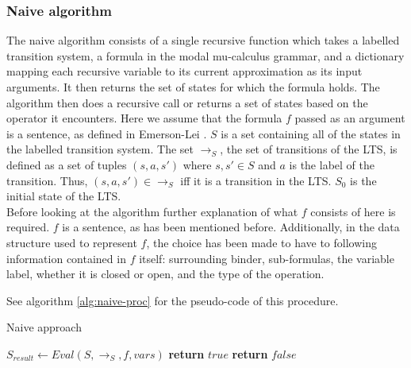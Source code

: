 \documentclass[10pt,a4paper]{article}
\begin{document}
\subsubsection{Naive algorithm}
The naive algorithm consists of a single recursive function which takes a labelled transition system, a formula in the modal mu-calculus grammar, and a dictionary mapping each recursive variable to its current approximation as its input arguments. It then returns the set of states for which the formula holds. The algorithm then does a recursive call or returns a set of states based on the operator it encounters. Here we assume that the formula $f$ passed as an argument is a sentence, as defined in Emerson-Lei \cite{elpaper}. $S$ is a set containing all of the states in the labelled transition system. The set $\to_S$, the set of transitions of the LTS, is defined as a set of tuples $(s,a,s\prime)$ where $s,s\prime \in S$ and $a$ is the label of the transition. Thus, $(s,a,s\prime) \in \to_S$ iff it is a transition in the LTS. $S_0$ is the initial state of the LTS.\\

Before looking at the algorithm further explanation of what $f$ consists of here is required. $f$ is a sentence, as has been mentioned before. Additionally, in the data structure used to represent $f$, the choice has been made to have to following information contained in $f$ itself: surrounding binder, sub-formulas, the variable label, whether it is closed or open, and the type of the operation. 

See algorithm \ref{alg:naive-proc} for the pseudo-code of this procedure.

\begin{algorithm}[H]
\caption{Naive approach}\label{alg:naive-proc}
\begin{algorithmic}[1]
	\State $S_{result} \gets Eval(S, \to_S,f, vars)$
        	\State \textbf{return} $true$ 
        \Else
			\State \textbf{return} $false$ 
		\EndIf
	\EndProcedure
\end{algorithmic}
\end{algorithm}
\end{document}

